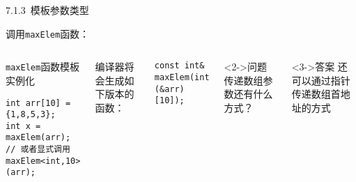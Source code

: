 \begin{frame}[fragile]{7.1.3~模板参数类型}

调用\texttt{maxElem}函数：

\vspace{-4mm}

\begin{columns}[t]

\begin{blueblock}{\texttt{maxElem}函数模板实例化}
\begin{lstlisting}
int arr[10] = {1,8,5,3};
int x = maxElem(arr);
// 或者显式调用 maxElem<int,10>(arr);
\end{lstlisting}
\end{blueblock}
编译器将会生成如下版本的函数：
\begin{blueblock}{}
\vspace{-2.5mm}\begin{lstlisting}
const int& maxElem(int (&arr)[10]);
\end{lstlisting}\vspace{-2mm}
\end{blueblock}

\begin{greenblock}<2->{问题}
传递数组参数还有什么方式？
\end{greenblock}
\begin{greenblock}<3->{答案}
还可以通过指针传递数组首地址的方式
\end{greenblock}

\end{columns}

\end{frame}


